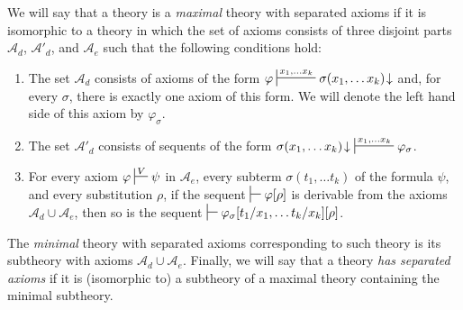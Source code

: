 \documentclass[reqno]{amsart}
\theoremstyle{definition}
\theoremstyle{remark}
\numberwithin{figure}{section}
\begin{document}
We will say that a theory is a \emph{maximal} theory with separated axioms if it is isomorphic to a theory in which the set of axioms consists of three disjoint parts $\mathcal{A}_d$, $\mathcal{A}'_d$, and $\mathcal{A}_e$ such that the following conditions hold:
\begin{enumerate}
\item The set $\mathcal{A}_d$ consists of axioms of the form $\varphi \sststile{}{x_1, \ldots x_k} \sigma(x_1, \ldots x_k)\!\downarrow$ and, for every $\sigma$, there is exactly one axiom of this form.
We will denote the left hand side of this axiom by $\varphi_\sigma$.
\item The set $\mathcal{A}'_d$ consists of sequents of the form $\sigma(x_1, \ldots x_k)\!\downarrow\ \sststile{}{x_1, \ldots x_k} \varphi_\sigma$.
\item For every axiom $\varphi \sststile{}{V} \psi$ in $\mathcal{A}_e$, every subterm $\sigma(t_1, \ldots t_k)$ of the formula $\psi$, and every substitution $\rho$,
if the sequent $\sststile{}{} \varphi[\rho]$ is derivable from the axioms $\mathcal{A}_d \cup \mathcal{A}_e$, then so is the sequent $\sststile{}{} \varphi_\sigma[t_1/x_1, \ldots t_k/x_k][\rho]$.
\end{enumerate}
The \emph{minimal} theory with separated axioms corresponding to such theory is its subtheory with axioms $\mathcal{A}_d \cup \mathcal{A}_e$.
Finally, we will say that a theory \emph{has separated axioms} if it is (isomorphic to) a subtheory of a maximal theory containing the minimal subtheory.
\end{document}
